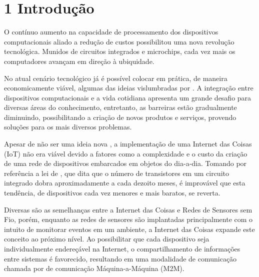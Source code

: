 \documentclass[twoside,english,brazilian]{UNISINOSmonografia}
\begin{document}
\chapter{1 Introdução}

{}

	O contínuo aumento na capacidade de processamento dos dispositivos 
	computacionais aliado a redução de custos possibilitou uma nova revolução 
	tecnológica. Munidos de circuitos integrados e microchips, cada vez mais 
	os computadores avançam em direção à ubiquidade. 
	
	No atual cenário tecnológico já é possível colocar em prática, de maneira 
	economicamente viável, algumas das ideias vislumbradas por 
	. A integração entre dispositivos computacionais e a 
	vida cotidiana apresenta um grande desafio para diversas áreas do 
	conhecimento, entretanto, as barreiras estão gradualmente diminuindo,
	possibilitando a criação de novos produtos e serviços, provendo soluções 
	para os mais diversos problemas.
	
	Apesar de não ser uma ideia nova \cite{Turck2013}, a implementação de uma 
	Internet das Coisas (IoT) não era viável devido a fatores como a 
	complexidade e 
	o custo da criação de uma rede de dispositivos embarcados em objetos do 
	dia-a-dia. Tomando por referência a lei de , que dita 
	que o número de transistores em um circuito integrado dobra 
	aproximadamente a cada dezoito meses, é improvável que esta tendência, de 
	dispositivos cada vez menores e mais baratos, se reverta.
	
	Diversas são as semelhanças entre a Internet das Coisas e Redes de 
	Sensores sem Fio, porém, enquanto as redes de sensores 
	\cite{Sakthidharan2012} 
	são implantadas principalmente com o intuito de monitorar eventos em um 
	ambiente, a Internet das Coisas expande este conceito ao próximo nível. Ao 
	possibilitar que cada dispositivo seja individualmente endereçável na 
	Internet, o compartilhamento de informações entre sistemas é favorecido, 
	resultando em uma modalidade de comunicação chamada por 
	 de comunicação Máquina-a-Máquina (M2M).
\end{document}
